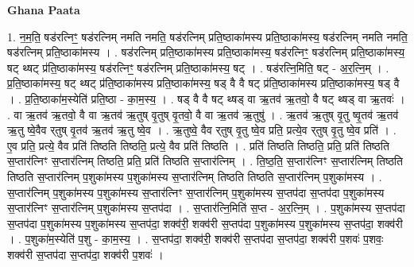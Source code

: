 \documentclass[17pt]{extarticle}
\begin{document}
\textbf{Ghana Paata } \newline

1. न॒म॒ति॒ षड॑रत्निꣳ॒॒ षड॑रत्निम् नमति नमति॒ षड॑रत्निम् प्रति॒ष्ठाका॑मस्य प्रति॒ष्ठाका॑मस्य॒ षड॑रत्निम् नमति नमति॒ षड॑रत्निम् प्रति॒ष्ठाका॑मस्य । . षड॑रत्निम् प्रति॒ष्ठाका॑मस्य प्रति॒ष्ठाका॑मस्य॒ षड॑रत्निꣳ॒॒ षड॑रत्निम् प्रति॒ष्ठाका॑मस्य॒ षट् थ्षट् प्र॑ति॒ष्ठाका॑मस्य॒ षड॑रत्निꣳ॒॒ षड॑रत्निम् प्रति॒ष्ठाका॑मस्य॒ षट् । . षड॑रत्नि॒मिति॒ षट् - अ॒र॒त्नि॒म् । . प्र॒ति॒ष्ठाका॑मस्य॒ षट् थ्षट् प्र॑ति॒ष्ठाका॑मस्य प्रति॒ष्ठाका॑मस्य॒ षड् वै वै षट् प्र॑ति॒ष्ठाका॑मस्य प्रति॒ष्ठाका॑मस्य॒ षड् वै । . प्र॒ति॒ष्ठाका॑म॒स्येति॑ प्रति॒ष्ठा - का॒म॒स्य॒ । . षड् वै वै षट् थ्षड् वा ऋ॒तव॑ ऋ॒तवो॒ वै षट् थ्षड् वा ऋ॒तवः॑ । . वा ऋ॒तव॑ ऋ॒तवो॒ वै वा ऋ॒तव॑ ऋ॒तुष् वृ॒तुष् वृ॒तवो॒ वै वा ऋ॒तव॑ ऋ॒तुषु॑ । . ऋ॒तव॑ ऋ॒तुष् वृ॒तु ष्वृ॒तव॑ ऋ॒तव॑ ऋ॒तु ष्वे॒वैव र्‌तुष् वृ॒तव॑ ऋ॒तव॑ ऋ॒तु ष्वे॒व । . ऋ॒तुष्वे॒ वैव र्‌तुष् वृ॒तु ष्वे॒व प्रति॒ प्रत्ये॒व र्‌तुष् वृ॒तु ष्वे॒व प्रति॑ । . ए॒व प्रति॒ प्रत्ये॒ वैव प्रति॑ तिष्ठति तिष्ठति॒ प्रत्ये॒ वैव प्रति॑ तिष्ठति । . प्रति॑ तिष्ठति तिष्ठति॒ प्रति॒ प्रति॑ तिष्ठति स॒प्तार॑त्निꣳ स॒प्तार॑त्निम् तिष्ठति॒ प्रति॒ प्रति॑ तिष्ठति स॒प्तार॑त्निम् । . ति॒ष्ठ॒ति॒ स॒प्तार॑त्निꣳ स॒प्तार॑त्निम् तिष्ठति तिष्ठति स॒प्तार॑त्निम् प॒शुका॑मस्य प॒शुका॑मस्य स॒प्तार॑त्निम् तिष्ठति तिष्ठति स॒प्तार॑त्निम् प॒शुका॑मस्य । . स॒प्तार॑त्निम् प॒शुका॑मस्य प॒शुका॑मस्य स॒प्तार॑त्निꣳ स॒प्तार॑त्निम् प॒शुका॑मस्य स॒प्तप॑दा स॒प्तप॑दा प॒शुका॑मस्य स॒प्तार॑त्निꣳ स॒प्तार॑त्निम् प॒शुका॑मस्य स॒प्तप॑दा । . स॒प्तार॑त्नि॒मिति॑ स॒प्त - अ॒र॒त्नि॒म् । . प॒शुका॑मस्य स॒प्तप॑दा स॒प्तप॑दा प॒शुका॑मस्य प॒शुका॑मस्य स॒प्तप॑दा॒ शक्व॑री॒ शक्व॑री स॒प्तप॑दा प॒शुका॑मस्य प॒शुका॑मस्य स॒प्तप॑दा॒ शक्व॑री । . प॒शुका॑म॒स्येति॑ प॒शु - का॒म॒स्य॒ । . स॒प्तप॑दा॒ शक्व॑री॒ शक्व॑री स॒प्तप॑दा स॒प्तप॑दा॒ शक्व॑री प॒शवः॑ प॒शवः॒ शक्व॑री स॒प्तप॑दा स॒प्तप॑दा॒ शक्व॑री प॒शवः॑ । \newline
\end{document}
